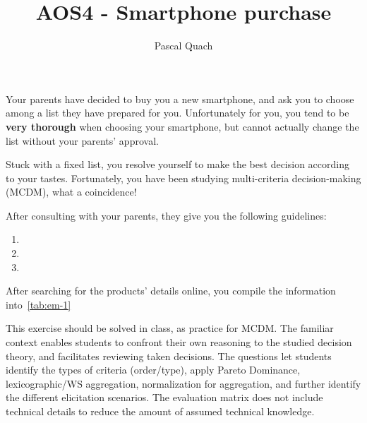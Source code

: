 \documentclass[10pt, UKenglish]{exam}
\newcommand{\price}[1]{\SI[round-precision=2,round-mode=places]{#1}[]{\SIeuro}}
\begin{document}
\title{AOS4 - Smartphone purchase}
\author{Pascal Quach}
\maketitle

Your parents have decided to buy you a new smartphone, and ask you to choose
among  a list they have prepared for you. Unfortunately for you, you tend to be
\textbf{very thorough} when choosing your smartphone, but cannot actually change the list
without your parents' approval.

Stuck with a fixed list, you resolve yourself to make the best decision
according to your tastes. Fortunately, you have been studying multi-criteria
decision-making (MCDM), what a coincidence!

After consulting with your parents, they give you the following guidelines:

\begin{enumerate}
	\item \textquote{The price cannot exceed \price{1000}}
	\item {}
	\item {}
\end{enumerate}

After searching for the products' details online, you compile the information into~\cref{tab:em-1}

\begin{comments}
	This exercise should be solved in class, as practice for MCDM.
	The familiar context enables students to confront their own
	reasoning to the studied decision theory, and facilitates
	reviewing taken decisions.
	The questions let students identify the types of criteria
	(order/type), apply Pareto Dominance, lexicographic/WS
	aggregation, normalization for aggregation, and further
	identify the different elicitation scenarios.
	The evaluation matrix does not include technical details to
	reduce the amount of assumed technical knowledge.
\end{comments}
\end{document}
